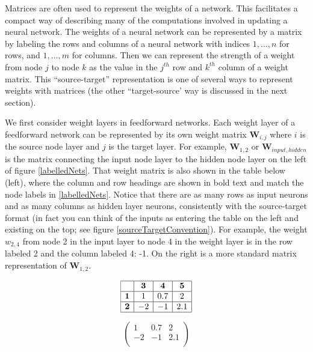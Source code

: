
Matrices are often used to represent the weights of a network. This facilitates a compact way of describing many of the computations involved in updating a neural network. The weights of a neural network can be represented by a matrix by labeling the rows and columns of a neural network with indices $1,\dots,n$ for rows, and $1,\dots,m$ for columns. Then we can represent the strength of a weight from node $j$ to node $k$ as the value in the $j^{th}$ row and $k^{th}$ column of a weight matrix. This ``source-target'' representation is one of several ways to represent weights with matrices (the other ``target-source' way is discussed in the next section).

We first consider weight layers in feedforward networks. Each weight layer of a feedforward network can be represented by its own weight matrix $\textbf{W}_{i,j}$ where $i$ is the source node layer and $j$ is the target layer. For example, $\textbf{W}_{1,2}$ or $\textbf{W}_{input,hidden}$ is the matrix connecting the input node layer to the hidden node layer on the left of figure \ref{labelledNets}. That weight matrix is also shown in the table below (left), where the column and row headings are shown in bold text and match the node labels in \ref{labelledNets}. Notice that there are as many rows as input neurons and as many columns as hidden layer neurons, consistently with the source-target format (in fact you can think of the inputs as entering the table on the left and existing on the top; see figure \ref{sourceTargetConvention}). For example, the weight $w_{2,4}$ from node 2 in the input layer to node 4 in the weight layer is in the row labeled 2 and the column labeled 4: -1. On the right is a more standard matrix representation of $\textbf{W}_{1,2}$.

\begin{minipage}{0.5\textwidth}
\centering
\[
\begin{array}{|c|c|c|c|}
\hline
\multicolumn{1}{|c|}{} & \textbf{3} & \textbf{4} & \textbf{5} \\
\hline
\textbf{1} & 1 & 0.7 & 2 \\
\hline
\textbf{2} & -2 & -1 & 2.1 \\
\hline
\end{array}
\]
\end{minipage}
\begin{minipage}{0.5\textwidth}
\centering
\[
\begin{pmatrix}
1 & 0.7 & 2 \\
-2 & -1 & 2.1 \\
\end{pmatrix}
\]
\end{minipage}
\vspace*{.1cm} 

